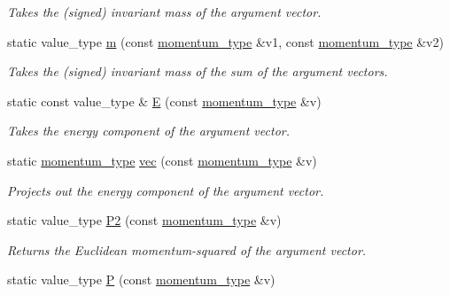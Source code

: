\begin{DoxyCompactItemize}
\begin{DoxyCompactList}\small\item\em Takes the (signed) invariant mass of the argument vector. \end{DoxyCompactList}\item 
\hypertarget{a00451_aa69c214d8a0919135c0726cc70f78556}{}static value\+\_\+type \hyperlink{a00451_aa69c214d8a0919135c0726cc70f78556}{m} (const \hyperlink{a00579}{momentum\+\_\+type} \&v1, const \hyperlink{a00579}{momentum\+\_\+type} \&v2)\label{a00451_aa69c214d8a0919135c0726cc70f78556}

\begin{DoxyCompactList}\small\item\em Takes the (signed) invariant mass of the sum of the argument vectors. \end{DoxyCompactList}\item 
\hypertarget{a00451_a8a2e0cd9b961dcfa2eb1ac7426cf3f5f}{}static const value\+\_\+type \& \hyperlink{a00451_a8a2e0cd9b961dcfa2eb1ac7426cf3f5f}{E} (const \hyperlink{a00579}{momentum\+\_\+type} \&v)\label{a00451_a8a2e0cd9b961dcfa2eb1ac7426cf3f5f}

\begin{DoxyCompactList}\small\item\em Takes the energy component of the argument vector. \end{DoxyCompactList}\item 
\hypertarget{a00451_abcd8c1b1d66ee3e9d7203115a3f2be73}{}static \hyperlink{a00579}{momentum\+\_\+type} \hyperlink{a00451_abcd8c1b1d66ee3e9d7203115a3f2be73}{vec} (const \hyperlink{a00579}{momentum\+\_\+type} \&v)\label{a00451_abcd8c1b1d66ee3e9d7203115a3f2be73}

\begin{DoxyCompactList}\small\item\em Projects out the energy component of the argument vector. \end{DoxyCompactList}\item 
\hypertarget{a00451_a75e11d7eafdcb47b1d0030ef834d1bf2}{}static value\+\_\+type \hyperlink{a00451_a75e11d7eafdcb47b1d0030ef834d1bf2}{P2} (const \hyperlink{a00579}{momentum\+\_\+type} \&v)\label{a00451_a75e11d7eafdcb47b1d0030ef834d1bf2}

\begin{DoxyCompactList}\small\item\em Returns the Euclidean momentum-\/squared of the argument vector. \end{DoxyCompactList}\item 
\hypertarget{a00451_a3de3823ace2a7d741b8526cc6b2fb56d}{}static value\+\_\+type \hyperlink{a00451_a3de3823ace2a7d741b8526cc6b2fb56d}{P} (const \hyperlink{a00579}{momentum\+\_\+type} \&v)\label{a00451_a3de3823ace2a7d741b8526cc6b2fb56d}


\end{DoxyCompactItemize}
